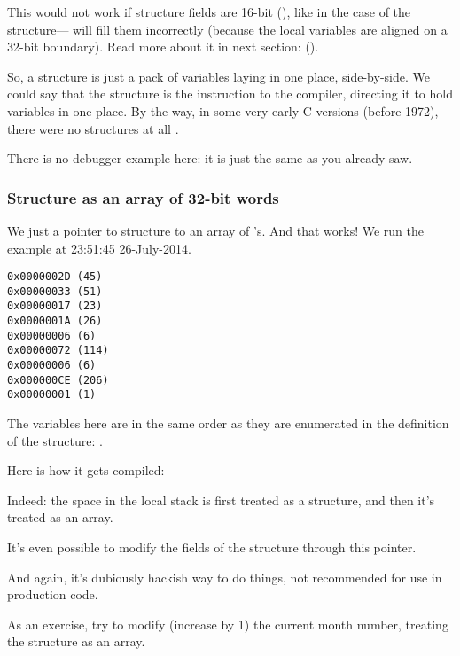 This would not work if structure fields are 16-bit (), 
like in the case of the  structure--- 
will fill them incorrectly 
(because the local variables are aligned on a 32-bit boundary).
Read more about it in next section: 
\q{\StructurePackingSectionName} ().

So, a structure is just a pack of variables laying in one place, side-by-side.
We could say that the structure is the instruction to the compiler, directing it to hold variables in one place.
By the way, in some very early C versions (before 1972), there were no structures at all \RitchieDevC.

There is no debugger example here: it is just the same as you already saw.

\subsubsection{Structure as an array of 32-bit words}



We just  a pointer to structure to an array of \Tint{}'s.
And that works!
We run the example at 23:51:45 26-July-2014.

\begin{lstlisting}[label=GCC_tm3_output]
0x0000002D (45)
0x00000033 (51)
0x00000017 (23)
0x0000001A (26)
0x00000006 (6)
0x00000072 (114)
0x00000006 (6)
0x000000CE (206)
0x00000001 (1)
\end{lstlisting}

The variables here 
are in the same order as they are enumerated in the definition of the structure: .

Here is how it gets compiled:



Indeed: the space in the local stack is first treated as a structure, and then it's treated as an array.

It's even possible to modify the fields of the structure through this pointer.

And again, it's dubiously hackish way to do things, not recommended for use in production code.

\mysubparagraph{\Exercise}

As an exercise, try to modify (increase by 1) the current month number, treating the structure as 
an array.

